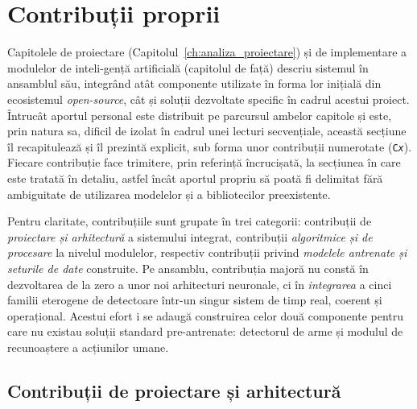 \documentclass[../../main.tex]{subfiles}
\begin{document}
\section{Contribuții proprii}
\label{sec:contributii_proprii}

Capitolele de proiectare (Capitolul~\ref{ch:analiza_proiectare}) și de implementare a modulelor de inteli-gență artificială (capitolul de față) descriu sistemul în ansamblul său, integrând atât componente utilizate în forma lor inițială din ecosistemul \textit{open-source}, cât și soluții dezvoltate specific în cadrul acestui proiect. Întrucât aportul personal este distribuit pe parcursul ambelor capitole și este, prin natura sa, dificil de izolat în cadrul unei lecturi secvențiale, această secțiune îl recapitulează și îl prezintă explicit, sub forma unor contribuții numerotate (\texttt{C\textit{x}}). Fiecare contribuție face trimitere, prin referință încrucișată, la secțiunea în care este tratată în detaliu, astfel încât aportul propriu să poată fi delimitat fără ambiguitate de utilizarea modelelor și a bibliotecilor preexistente.

Pentru claritate, contribuțiile sunt grupate în trei categorii: contribuții de \emph{proiectare și arhitectură} a sistemului integrat, contribuții \emph{algoritmice și de procesare} la nivelul modulelor, respectiv contribuții privind \emph{modelele antrenate și seturile de date} construite. Pe ansamblu, contribuția majoră nu constă în dezvoltarea de la zero a unor noi arhitecturi neuronale, ci în \emph{integrarea} a cinci familii eterogene de detectoare într-un singur sistem de timp real, coerent și operațional. Acestui efort i se adaugă construirea celor două componente pentru care nu existau soluții standard pre-antrenate: detectorul de arme și modulul de recunoaștere a acțiunilor umane.

\subsection{Contribuții de proiectare și arhitectură}
\label{subsec:contributii_proiectare}
\end{document}
